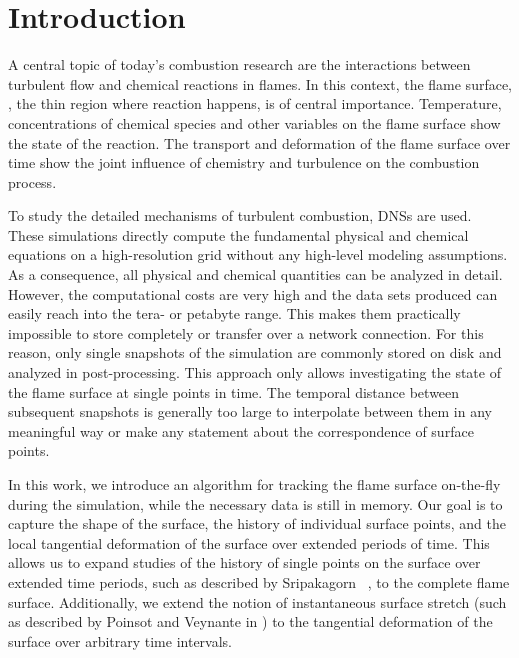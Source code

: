 
%
\section{Introduction} %
\label{sec:fst_introduction}
%
A central topic of today's combustion research are the interactions between
turbulent flow and chemical reactions in flames.
%
In this context, the flame surface, \ie, the thin region where reaction happens,
is of central importance.
%
Temperature, concentrations of chemical species and other variables on the flame
surface show the state of the reaction.
%
The transport and deformation of the flame surface over time show the joint
influence of chemistry and turbulence on the combustion process.
%

%
To study the detailed mechanisms of turbulent combustion, \acp{DNS} are used.
%
These simulations directly compute the fundamental physical and chemical
equations on a high-resolution grid without any high-level modeling assumptions.
%
As a consequence, all physical and chemical quantities can be analyzed in detail.
%
However, the computational costs are very high and the data sets produced can
easily reach into the tera- or petabyte range.
%
This makes them practically impossible to store completely or transfer over a
network connection.
%
For this reason, only single snapshots of the simulation are commonly stored
on disk and analyzed in post-processing.
%
This approach only allows investigating the state of the flame surface at single
points in time.
%
The temporal distance between subsequent snapshots is generally too large to
interpolate between them in any meaningful way or make any statement about
the correspondence of surface points.
%

%
In this work, we introduce an algorithm for tracking the flame surface
on-the-fly during the simulation, while the necessary data is still in memory.
%
Our goal is to capture the shape of the surface, the history of individual
surface points, and the local tangential deformation of the surface over
extended periods of time.
%
This allows us to expand studies of the history of single points on the surface
over extended time periods, such as described by Sripakagorn
\etal~\cite{Sripakagorn2004}, to the complete flame surface.
%
Additionally, we extend the notion of instantaneous surface stretch (such as
described by Poinsot and Veynante in \cite{Poinsot2012}) to the tangential
deformation of the surface over arbitrary time intervals.
%

